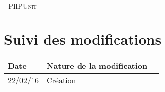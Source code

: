 \documentclass[asi, sansVersion]{picInsa}
\begin{document}
	\begin{center}
		\LARGE
		\textsc{
			\FF{}\\
			 - PHPUnit
		}
	\end{center}
	\vspace{0.5cm}

	\section*{Suivi des modifications}
		\begin{table}[H]
			\centering
			\begin{tabularx}{18cm}{|p{1.7cm}|X|p{4cm}|}
				\hline
				\rowcolor[gray]{0.90} Date & Nature de la modification \\
				\hline
				
				22/02/16 & Création \\
				\hline
			\end{tabularx}
		\end{table}
\end{document}
